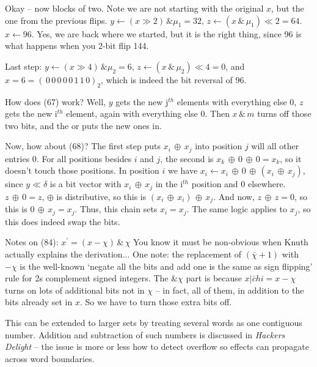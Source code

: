 Okay -- now blocks of two.  Note we are
not starting with the original $x$, but the one
from the previous flips.
$y \gets \left(x \gg 2\right) \, \& \mu_1 = 32$,
$z \gets \left(x \, \& \, \mu_1\right) \ll 2 = 64$.
$x \gets 96$.  Yes, we are back where we started,
but it is the right thing, since 96 is what happens when
you 2-bit flip 144.  

Last step: $y \gets \left(x \gg 4\right) \, \& \mu_2 = 6$,
$z \gets \left(x \, \& \, \mu_2\right) \ll 4 = 0$,
and $x = 6 = \left(\,0\,0\,0\,0\,0\,1\,1\,0\right)_2$,
which is indeed the bit reversal of 96.

\vskip 0.1in 
\noindent [p 144] How does (67) work?\hfil\break
Well, $y$ gets the new j$^{th}$ elements with everything
else 0, $z$ gets the new i$^{th}$ element, again with
everything else 0.  Then $x \, \& \, m$ turns off those two
bits, and the or puts the new ones in.

 Now, how about (68)?\hfil\break
The first step puts $x_i \, \oplus \, x_j$ into position $j$ will all
other entries 0.  For all positions besides $i$ and $j$, the second
is $x_k \, \oplus \, 0 \, \oplus \, 0 = x_k$, so it doesn't touch those
positions.  In position $i$ we have $x_i \gets x_i \, \oplus \, 0 \, \oplus \,
\left(x_i \, \oplus \, x_j\right)$, since $y \ll \delta$ is a bit vector
with $x_i \, \oplus \, x_j$ in the i$^{th}$ position and 0 elsewhere.
$z \, \oplus \, 0 = z$, $\oplus$ is distributive, so this is
$\left(x_i \, \oplus \, x_i\right) \, \oplus \, x_j$.  And now, 
$z \, \oplus \, z = 0$, so this is $0 \, \oplus \, x_j = x_j$.
Thus, this chain sets $x_i = x_j$.  The same logic applies
to $x_j$, so this does indeed swap the bits.

 Notes on (84): $x^{\prime} = 
\left(x - \chi\right) \, \& \, \chi$\hfil\break
You know it must be non-obvious when Knuth actually explains
the derivation...  One note: the replacement of $\left( \bar \chi + 1\right)$
with $-\chi$ is the well-known `negate all the bits and add one is the same
as sign flipping' rule for 2s complement signed integers.  The $\& \chi$
part is because $x | \bar chi = x - \chi$ turns on lots of additional
bits not in $\chi$ -- in fact, all of them, in addition to the bits already
set in $x$.  So we have to turn those extra bits off.

This can be extended to larger sets by treating several words as
one contiguous number.  Addition and subtraction of such numbers 
is discussed in {\it Hackers Delight} -- the issue is more or less
how to detect overflow so effects can propagate across word
boundaries.

